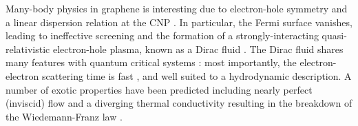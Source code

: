 Many-body physics in graphene is interesting due to electron-hole symmetry and a linear dispersion relation at the CNP \cite{novoselov_two-dimensional_2005, zhang_experimental_2005}. In particular, the Fermi surface vanishes, leading to ineffective screening \cite{siegel_charge-carrier_2013} and the formation of a strongly-interacting quasi-relativistic electron-hole plasma, known as a Dirac fluid \cite{sheehy_quantum_2007}.  The Dirac fluid shares many features with quantum critical systems \cite{keimer_quantum_2011}: most importantly, the electron-electron scattering time is fast \cite{lui_ultrafast_2010, breusing_ultrafast_2009, tielrooij_photoexcitation_2013, johannsen_direct_2013}, and well suited to a hydrodynamic description.   A number of exotic properties have been predicted including nearly perfect (inviscid) flow \cite{muller_graphene:_2009} and a diverging thermal conductivity resulting in the breakdown of the Wiedemann-Franz law \cite{muller_quantum-critical_2008,foster_slow_2009}.



